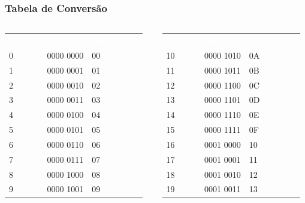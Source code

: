 \documentclass[aspectratio=169,
				xcolor=table]{beamer}
\begin{document}
		\begin{frame}
			\frametitle{Tabela de Conversão}
			
			\begin{columns}
				\begin{column}{0.45\paperwidth}
					\begin{eftable}
						\begin{tabular}{l|l|l}
							\textcolor{white}{Decimal} & 
							\textcolor{white}{Binário} & 
							\textcolor{white}{Hexadecimal} \\
							0 & 0000 0000 & 00 \\
							1 & 0000 0001 & 01 \\
							2 & 0000 0010 & 02 \\
							3 & 0000 0011 & 03 \\
							4 & 0000 0100 & 04 \\
							5 & 0000 0101 & 05 \\
							6 & 0000 0110 & 06 \\
							7 & 0000 0111 & 07 \\
							8 & 0000 1000 & 08 \\
							9 & 0000 1001 & 09 \\
						
						\end{tabular}
					\end{eftable}
				\end{column}
				\begin{column}{0.45\paperwidth}
					\begin{eftable}
						\begin{tabular}{l|l|l}
							\textcolor{white}{Decimal} & 
							\textcolor{white}{Binário} & 
							\textcolor{white}{Hexadecimal} \\
							10 & 0000 1010 & 0A \\
							11 & 0000 1011 & 0B \\
							12 & 0000 1100 & 0C \\
							13 & 0000 1101 & 0D \\
							14 & 0000 1110 & 0E \\
							15 & 0000 1111 & 0F \\
							16 & 0001 0000 & 10 \\
							17 & 0001 0001 & 11 \\
							18 & 0001 0010 & 12 \\
							19 & 0001 0011 & 13 \\
							
						
						\end{tabular}
					\end{eftable}
				\end{column}
			\end{columns}
		\end{frame}	
			
\end{document}
